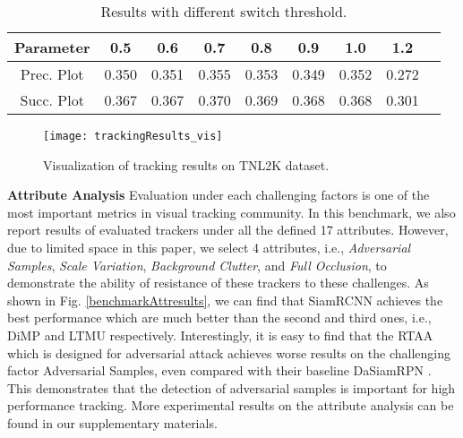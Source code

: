 \documentclass[final]{cvpr}
\begin{document}
\begin{table}[!htp]
\center
\scriptsize 
\caption{Results with different switch threshold.}  
\label{thresholdAnalysis} 
\begin{tabular}{c|cccccccc}
\hline \toprule [0.8 pt] 
Parameter 			&0.5			&0.6  			&0.7  			&0.8				&0.9 	  		&1.0 		 		&1.2    			\\
\hline 
Prec. Plot		&0.350		&0.351  		&0.355  		&0.353			&0.349 	  	&0.352 		 	&0.272    		\\
\hline 
Succ. Plot		&0.367		&0.367  		&0.370  		&0.369			&0.368 	  	&0.368 		 	&0.301    		\\
\hline \toprule [0.8 pt]
\end{tabular}
\end{table} 





\begin{figure}[!htb]
\center
\texttt{[image: trackingResults\_vis]}
\caption{Visualization of tracking results on TNL2K dataset. }
\label{trackingResults_vis}
\end{figure} 	



\textbf{Attribute Analysis } 
Evaluation under each challenging factors is one of the most important metrics in visual tracking community. In this benchmark, we also report results of evaluated trackers under all the defined 17 attributes. However, due to limited space in this paper, we select 4 attributes, i.e., \emph{Adversarial Samples}, \emph{Scale Variation}, \emph{Background Clutter}, and \emph{Full Occlusion}, to demonstrate the ability of resistance of these trackers to these challenges. As shown in Fig. \ref{benchmarkAttresults}, we can find that SiamRCNN \cite{voigtlaender2020siamRCNN} achieves the best performance which are much better than the second and third ones, i.e., DiMP \cite{bhat2019DiMP} and LTMU \cite{dai2020ltmu} respectively. Interestingly, it is easy to find that the RTAA \cite{jia2020TrackAttack} which is designed for adversarial attack achieves worse results on the challenging factor Adversarial Samples, even compared with their baseline DaSiamRPN \cite{zhu2018distractor}. This demonstrates that the detection of adversarial samples is important for high performance tracking. More experimental results on the attribute analysis can be found in our supplementary materials. 



 
\end{document}
